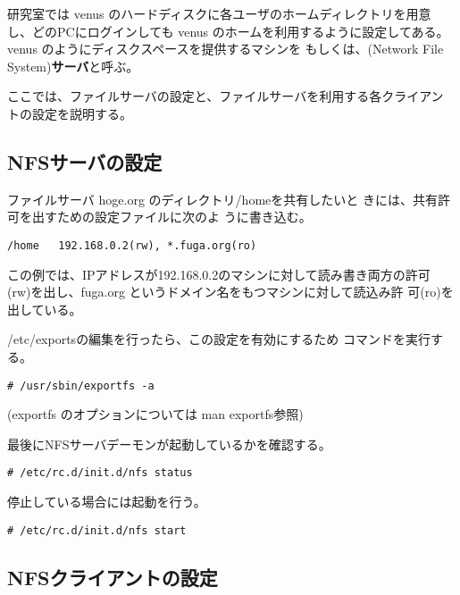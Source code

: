 \documentclass{jreport}
\begin{document}
研究室では venus のハードディスクに各ユーザのホームディレクトリを用意
し、どのPCにログインしても venus のホームを利用するように設定してある。
venus のようにディスクスペースを提供するマシンを
もしくは、(Network File System)\textbf{サーバ}と呼ぶ。

ここでは、ファイルサーバの設定と、ファイルサーバを利用する各クライアン
トの設定を説明する。


\subsection{NFSサーバの設定}

ファイルサーバ hoge.org のディレクトリ{\ttfamily /home}を共有したいと
きには、共有許可を出すための設定ファイルに次のよ
うに書き込む。
\begin{screen}
\begin{verbatim}
/home   192.168.0.2(rw), *.fuga.org(ro)
\end{verbatim}
\end{screen}

この例では、IPアドレスが192.168.0.2のマシンに対して読み書き両方の許可
(rw)を出し、fuga.org というドメイン名をもつマシンに対して読込み許
可(ro)を出している。

{\ttfamily /etc/exports}の編集を行ったら、この設定を有効にするため
コマンドを実行する。
\begin{screen}
\begin{verbatim}
# /usr/sbin/exportfs -a
\end{verbatim}
\end{screen}
(exportfs のオプションについては man exportfs参照)

最後にNFSサーバデーモンが起動しているかを確認する。
\begin{screen}
\begin{verbatim}
# /etc/rc.d/init.d/nfs status
\end{verbatim}
\end{screen}
停止している場合には起動を行う。
\begin{screen}
\begin{verbatim}
# /etc/rc.d/init.d/nfs start
\end{verbatim}
\end{screen}


\subsection{NFSクライアントの設定}
\end{document}
